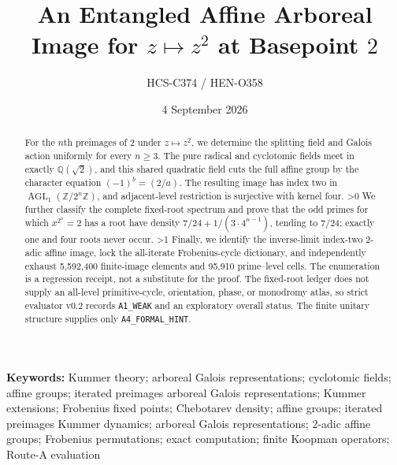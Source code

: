 \documentclass[10pt]{article}
\title{An Entangled Affine Arboreal Image for $z\mapsto z^2$ at Basepoint $2$}
\author{HCS-C374 / HEN-O358}
\date{4 September 2026}
\newcommand{\Q}{\mathbb Q}
\newcommand{\Z}{\mathbb Z}
\newcommand{\AGL}{\operatorname{AGL}}
\begin{document}
\maketitle

\begin{abstract}
For the $n$th preimages of $2$ under $z\mapsto z^2$, we determine the
splitting field and Galois action uniformly for every $n\ge3$.  The pure
radical and cyclotomic fields meet in exactly $\Q(\sqrt2)$, and this shared
quadratic field cuts the full affine group by the character equation
$(-1)^b=(2/a)$.  The resulting image has index two in
$\AGL_1(\Z/2^n\Z)$, and adjacent-level restriction is surjective with
kernel four.
\ifnum\CRevisionRound>0
We further classify the complete fixed-root spectrum and prove that the odd
primes for which $x^{2^n}=2$ has a root have density
$7/24+1/(3\cdot4^{n-1})$, tending to $7/24$; exactly one and four roots
never occur.
\fi
\ifnum\CRevisionRound>1
Finally, we identify the inverse-limit index-two $2$-adic affine image,
lock the all-iterate Frobenius-cycle dictionary, and independently exhaust
5,592,400 finite-image elements and 95,910 prime--level cells.  The
enumeration is a regression receipt, not a substitute for the proof.
The fixed-root ledger does not supply an all-level primitive-cycle,
orientation, phase, or monodromy atlas, so strict evaluator v0.2 records
\texttt{A1\_WEAK} and an exploratory overall status.  The finite unitary
structure supplies only \texttt{A4\_FORMAL\_HINT}.
\fi
\end{abstract}

\noindent\textbf{Keywords:}
\ifcase\CRevisionRound
Kummer theory; arboreal Galois representations; cyclotomic fields; affine
groups; iterated preimages
\or
arboreal Galois representations; Kummer extensions; Frobenius fixed points;
Chebotarev density; affine groups; iterated preimages
\else
Kummer dynamics; arboreal Galois representations; 2-adic affine groups;
Frobenius permutations; exact computation; finite Koopman operators;
Route-A evaluation
\fi
\end{document}
